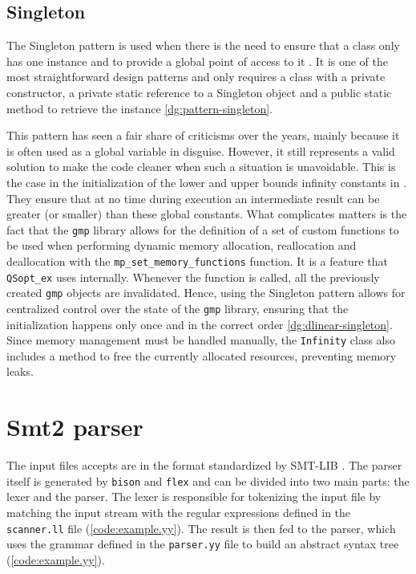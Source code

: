 \subsection*{Singleton}

The Singleton pattern is used when there is the need to ensure that a class only has one instance and to provide a global point of access to it \cite{book:gof}.
It is one of the most straightforward design patterns and only requires a class with a private constructor, a private static reference to a Singleton object and a public static method to retrieve the instance \autoref{dg:pattern-singleton}.


This pattern has seen a fair share of criticisms over the years, mainly because it is often used as a global variable in disguise.
However, it still represents a valid solution to make the code cleaner when such a situation is unavoidable.
This is the case in the initialization of the lower and upper bounds infinity constants in \dlinear.
They ensure that at no time during execution an intermediate result can be greater (or smaller) than these global constants.
What complicates matters is the fact that the \texttt{gmp} library allows for the definition of a set of custom functions to be used when performing dynamic memory allocation, reallocation and deallocation with the \texttt{mp\_set\_memory\_functions} function.
It is a feature that \texttt{QSopt\_ex} uses internally.
Whenever the function is called, all the previously created \texttt{gmp} objects are invalidated.
Hence, using the Singleton pattern allows for centralized control over the state of the \texttt{gmp} library, ensuring that the initialization happens only once and in the correct order \autoref{dg:dlinear-singleton}.
Since memory management must be handled manually, the \texttt{Infinity} class also includes a method to free the currently allocated resources, preventing memory leaks.


\section{Smt2 parser}

The input files \dlinear accepts are in the format standardized by SMT-LIB \cite{docs:smtlib}.
The parser itself is generated by \texttt{bison} and \texttt{flex} and can be divided into two main parts: the lexer and the parser.
The lexer is responsible for tokenizing the input file by matching the input stream with the regular expressions defined in the \texttt{scanner.ll} file (\autoref{code:example.yy}).
The result is then fed to the parser, which uses the grammar defined in the \texttt{parser.yy} file to build an abstract syntax tree (\autoref{code:example.yy}).

